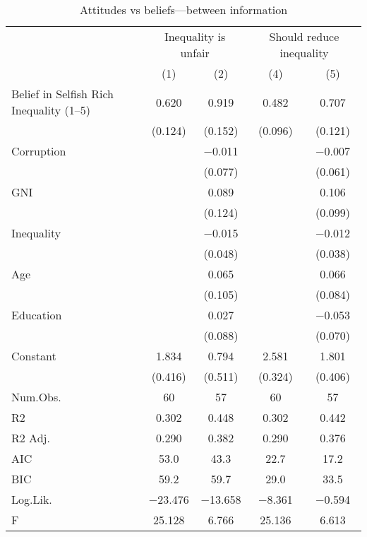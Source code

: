 \begin{table}

\caption{\label{tab:unnamed-chunk-65}Attitudes vs beliefs---between information}
\centering
\begin{tabular}[t]{lcccc}
\toprule
\multicolumn{1}{c}{ } & \multicolumn{2}{c}{Inequality is unfair} & \multicolumn{2}{c}{Should reduce inequality} \\
\cmidrule(l{3pt}r{3pt}){2-3} \cmidrule(l{3pt}r{3pt}){4-5}
  & (1) & (2) & (4) & (5)\\
\midrule
Belief in Selfish Rich Inequality (1--5) & \num{0.620} & \num{0.919} & \num{0.482} & \num{0.707}\\
 & (\num{0.124}) & (\num{0.152}) & (\num{0.096}) & (\num{0.121})\\
Corruption &  & \num{-0.011} &  & \num{-0.007}\\
 &  & (\num{0.077}) &  & (\num{0.061})\\
GNI &  & \num{0.089} &  & \num{0.106}\\
 &  & (\num{0.124}) &  & (\num{0.099})\\
Inequality &  & \num{-0.015} &  & \num{-0.012}\\
 &  & (\num{0.048}) &  & (\num{0.038})\\
Age &  & \num{0.065} &  & \num{0.066}\\
 &  & (\num{0.105}) &  & (\num{0.084})\\
Education &  & \num{0.027} &  & \num{-0.053}\\
 &  & (\num{0.088}) &  & (\num{0.070})\\
Constant & \num{1.834} & \num{0.794} & \num{2.581} & \num{1.801}\\
 & (\num{0.416}) & (\num{0.511}) & (\num{0.324}) & (\num{0.406})\\
\midrule
Num.Obs. & \num{60} & \num{57} & \num{60} & \num{57}\\
R2 & \num{0.302} & \num{0.448} & \num{0.302} & \num{0.442}\\
R2 Adj. & \num{0.290} & \num{0.382} & \num{0.290} & \num{0.376}\\
AIC & \num{53.0} & \num{43.3} & \num{22.7} & \num{17.2}\\
BIC & \num{59.2} & \num{59.7} & \num{29.0} & \num{33.5}\\
Log.Lik. & \num{-23.476} & \num{-13.658} & \num{-8.361} & \num{-0.594}\\
F & \num{25.128} & \num{6.766} & \num{25.136} & \num{6.613}\\
\bottomrule
\end{tabular}
\end{table}